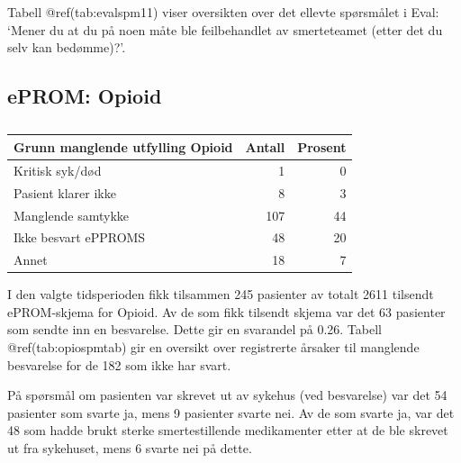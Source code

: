 \documentclass[
]{article}
\begin{document}
Tabell @ref(tab:evalspm11) viser oversikten over det ellevte spørsmålet
i Eval: `Mener du at du på noen måte ble feilbehandlet av smerteteamet
(etter det du selv kan bedømme)?'.

\hypertarget{eprom-opioid}{%
\subsection{ePROM: Opioid}\label{eprom-opioid}}

\begin{table}

\caption{\label{tab:opiospmtab}}
\centering
\begin{tabular}[t]{l|r|r}
\hline
Grunn manglende utfylling Opioid & Antall  & Prosent\\
\hline
Kritisk syk/død & 1 & 0\\
\hline
Pasient klarer ikke & 8 & 3\\
\hline
Manglende samtykke & 107 & 44\\
\hline
Ikke besvart ePPROMS & 48 & 20\\
\hline
Annet & 18 & 7\\
\hline
\end{tabular}
\end{table}

I den valgte tidsperioden fikk tilsammen 245 pasienter av totalt 2611
tilsendt ePROM-skjema for Opioid. Av de som fikk tilsendt skjema var det
63 pasienter som sendte inn en besvarelse. Dette gir en svarandel på
0.26. Tabell @ref(tab:opiospmtab) gir en oversikt over registrerte
årsaker til manglende besvarelse for de 182 som ikke har svart.

På spørsmål om pasienten var skrevet ut av sykehus (ved besvarelse) var
det 54 pasienter som svarte ja, mens 9 pasienter svarte nei. Av de som
svarte ja, var det 48 som hadde brukt sterke smertestillende
medikamenter etter at de ble skrevet ut fra sykehuset, mens 6 svarte nei
på dette.
\end{document}
